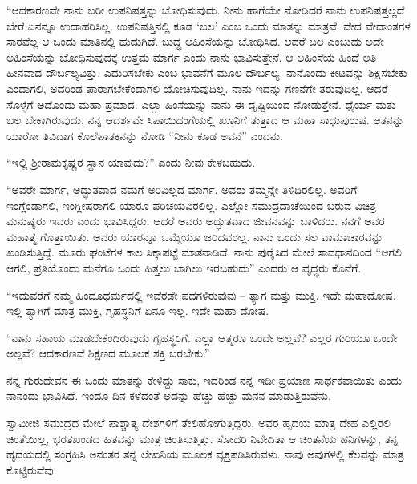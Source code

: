  “ಆದಕಾರಣವೇ ನಾನು ಬರೀ ಉಪನಿಷತ್ತನ್ನು ಬೋಧಿಸುವುದು. ನೀನು ಹಾಗೆಯೇ ನೋಡಿದರೆ ನಾನು ಉಪನಿಷತ್ತಲ್ಲದೆ ಬೇರೆ ಏನನ್ನೂ ಉದಾಹರಿಸಿಲ್ಲ. ಉಪನಿಷತ್ತಿನಲ್ಲಿ ಕೂಡ ‘ಬಲ’ ಎಂಬ ಒಂದು ಮಾತನ್ನು ಮಾತ್ರವೆ. ವೇದ ವೇದಾಂತಗಳ ಸಾರವೆಲ್ಲ ಆ ಒಂದು ಮಾತಿನಲ್ಲಿ ಹುದುಗಿದೆ. ಬುದ್ಧ ಅಹಿಂಸೆಯನ್ನು ಬೋಧಿಸಿದ. ಆದರೆ ಬಲ ಎಂಬುದು ಅದೇ ಅಹಿಂಸೆಯನ್ನು ಬೋಧಿಸುವುದಕ್ಕೆ ಉತ್ತಮ ಮಾರ್ಗ ಎಂದು ನಾನು ಭಾವಿಸುತ್ತೇನೆ. ಆ ಅಹಿಂಸೆಯ ಹಿಂದೆ ಅತಿ ಹೀನವಾದ ದೌರ್ಬಲ್ಯವಿತ್ತು. ಎದುರಿಸಬೇಕು ಎಂಬ ಭಾವನೆಗೆ ಮೂಲ ದೌರ್ಬಲ್ಯ. ನಾನೊಂದು ಕೀಟವನ್ನು ಶಿಕ್ಷಿಸಬೇಕು ಎಂದಾಗಲಿ, ಅದರಿಂಡ ಪಾರಾಗಬೇಕೆಂದಾಗಲಿ ಯೋಚಿಸುವುದಿಲ್ಲ. ನಾನು ಇದನ್ನು ಗಣನೆಗೇ ತರುವುದಿಲ್ಲ. ಆದರೆ ಸೊಳ್ಳೆಗೆ ಅದೊಂದು ಮಹಾ ಪ್ರಮಾದ. ಎಲ್ಲಾ ಹಿಂಸೆಯನ್ನು ನಾನು ಈ ದೃಷ್ಟಿಯಿಂದ ನೋಡುತ್ತೇನೆ. ಧೈರ್ಯ ಮತು ಬಲ ಬೇಕಾಗಿರುವುದು. ನನ್ನ ಆದರ್ಶವೇ ಸಿಪಾಯಿದಂಗೆಯಲ್ಲಿ ಖೂನಿಗೆ ತುತ್ತಾದ ಆ ಮಹಾ ಸಾಧುಪುರುಷ. ಆತನನ್ನು ಯಾರೋ ತಿವಿದಾಗ ಕೊಲೆಪಾತಕನನ್ನು ನೋಡಿ “ನೀನು ಕೂಡ ಅವನೆ” ಎಂದನು. 

 “ಇಲ್ಲಿ ಶ‍್ರೀರಾಮಕೃಷ್ಣರ ಸ್ಥಾನ ಯಾವುದು?” ಎಂದು ನೀವು ಕೇಳಬಹುದು. 

 “ಅವರೇ ಮಾರ್ಗ, ಅದ್ಭುತವಾದ ನಮಗೆ ಅರಿವಿಲ್ಲದ ಮಾರ್ಗ. ಅವರು ತಮ್ಮನ್ನೇ ತಿಳಿದಿರಲಿಲ್ಲ. ಅವರಿಗೆ ಇಂಗ್ಲೆಂಡಾಗಲಿ, ಇಂಗ್ಲೀಷರಾಗಲಿ ಯಾರೂ ಪರಿಚಯವಿರಲಿಲ್ಲ. ಎಲ್ಲೋ ಸಮುದ್ರದಾಚೆಯಿಂದ ಬರುವ ವಿಚಿತ್ರ ಮನುಷ್ಯರು ಇವರು ಎಂದು ಭಾವಿಸಿದ್ದರು. ಆದರೆ ಅವರು ಅದ್ಭುತವಾದ ಜೀವನವನ್ನು ಬಾಳಿದರು. ನನಗೆ ಅವರ ಮಹಾತ್ಮೆ ಗೊತ್ತಾಯಿತು. ಅವರು ಯಾರನ್ನೂ ಒಮ್ಮೆಯೂ ಜರಿದವರಲ್ಲ. ನಾನು ಒಂದು ಸಲ ವಾಮಾಚಾರವನ್ನು ಖಂಡಿಸುತ್ತಿದ್ದೆ. ಮೂರು ಘಂಟೆಗಳ ಕಾಲ ಸಿಕ್ಕಾಪಟ್ಟೆ ಮಾತನಾಡಿದೆ. ನಾನು ಪುರೈಸಿದ ಮೇಲೆ ಸಾವಧಾನದಿಂದ “ಆಗಲಿ ಆಗಲಿ, ಪ್ರತಿಯೊಂದು ಮನೆಗೂ ಒಂದು ಹಿತ್ತಲು ಬಾಗಿಲು ಇರಬಹುದು” ಎಂದರು ಆ ವೃದ್ಧರು ಕೊನೆಗೆ. 

 “ಇದುವರೆಗೆ ನಮ್ಮ ಹಿಂದೂಧರ್ಮದಲ್ಲಿ ಇವೆರಡೇ ಪದಗಳಿರುವುವು – ತ್ಯಾಗ ಮತ್ತು ಮುಕ್ತಿ. ಇದೇ ಮಹಾದೋಷ. ಇಲ್ಲಿ ತ್ಯಾಗಿಗೆ ಮಾತ್ರ ಮುಕ್ತಿ, ಗೃಹಸ್ಥನಿಗೆ ಏನೂ ಇಲ್ಲ. ಇದೇ ಮಹಾ ದೋಷ. 

 “ನಾನು ಸಹಾಯ ಮಾಡಬೇಕೆಂದಿರುವುದು ಗೃಹಸ್ಥರಿಗೆ. ಎಲ್ಲಾ ಆತ್ಮರೂ ಒಂದೇ ಅಲ್ಲವೆ? ಎಲ್ಲರ ಗುರಿಯೂ ಒಂದೇ ಅಲ್ಲವೆ? ಆದಕಾರಣವೆ ಶಿಕ್ಷಣದ ಮೂಲಕ ಶಕ್ತಿ ಬರಬೇಕು.” 

 ನನ್ನ ಗುರುದೇವನ ಈ ಒಂದು ಮಾತನ್ನು ಕೇಳಿದ್ದು ಸಾಕು, ಇದರಿಂಡ ನನ್ನ ಇಡೀ ಪ್ರಯಾಣ ಸಾರ್ಥಕವಾಯಿತು ಎಂದು ನಾನಂದು ಭಾವಿಸಿದೆ. ಇಂದೂ ದಿನ ಕಳೆದಂತೆ ಅದನ್ನು ಹೆಚ್ಚು ಹೆಚ್ಚು ಮನನ ಮಾಡುತ್ತಿರುವೆನು. 

\delimiter

 ಸ್ವಾಮೀಜಿ ಸಮುದ್ರದ ಮೇಲೆ ಪಾಶ್ಚಾತ್ಯ ದೇಶಗಳಿಗೆ ತೇಲಿಹೋಗುತ್ತಿದ್ದರು. ಅವರ ಹೃದಯ ಮಾತ್ರ ದೇಹ ಎಲ್ಲಿರಲಿ ಚಿಂತೆಯಿಲ್ಲ, ಭರತಖಂಡದ ಹಿತವನ್ನು ಮಾತ್ರ ಚಿಂತಿಸುತ್ತಿತ್ತು. ಸೋದರಿ ನಿವೇದಿತಾ ಆ ಚಿಂತನೆಯ ಹನಿಗಳನ್ನು, ತನ್ನ ಹೃದಯದಲ್ಲಿ ಸಂಗ್ರಹಿಸಿ ಅನಂತರ ತನ್ನ ಲೇಖನಿಯ ಮೂಲಕ ವ್ಯಕ್ತಪಡಿಸಿರುವಳು. ನಾವು ಅವುಗಳಲ್ಲಿ ಕೆಲವನ್ನು ಮಾತ್ರ ಕೊಟ್ಟಿರುವೆವು.

